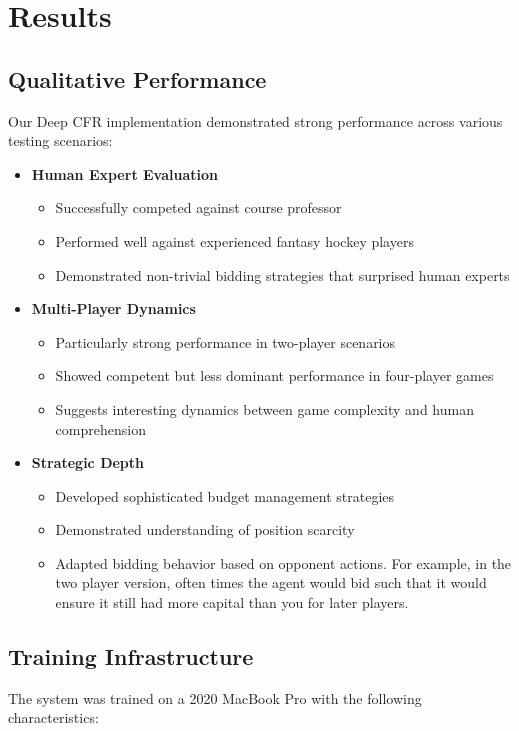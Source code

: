 \documentclass[11pt]{article}
\begin{document}
\section{Results}
\subsection{Qualitative Performance}
Our Deep CFR implementation demonstrated strong performance across various testing scenarios:

\begin{itemize}
    \item \textbf{Human Expert Evaluation}
    \begin{itemize}
        \item Successfully competed against course professor
        \item Performed well against experienced fantasy hockey players
        \item Demonstrated non-trivial bidding strategies that surprised human experts
    \end{itemize}
    
    \item \textbf{Multi-Player Dynamics}
    \begin{itemize}
        \item Particularly strong performance in two-player scenarios
        \item Showed competent but less dominant performance in four-player games
        \item Suggests interesting dynamics between game complexity and human comprehension
    \end{itemize}
    
    \item \textbf{Strategic Depth}
    \begin{itemize}
        \item Developed sophisticated budget management strategies
        \item Demonstrated understanding of position scarcity
        \item Adapted bidding behavior based on opponent actions. For example, in the two player version, often times the agent would bid such that it would ensure it still had more capital than you for later players.
    \end{itemize}
\end{itemize}

\subsection{Training Infrastructure}
The system was trained on a 2020 MacBook Pro with the following characteristics:
\end{document}
